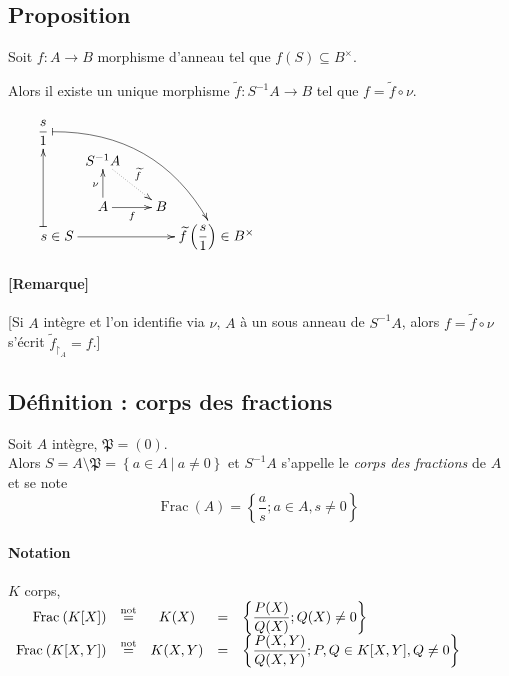 \documentclass[reqno,a4paper,10pt]{report}
\newcommand{\mt}[1]{\widetilde{#1}} %
\newcommand{\set}[1]{\left\lbrace #1 \right\rbrace} %
\newcommand{\Frac}{\mathrm{Frac}\:} %
\newcommand{\rstrct}[2]{{#1}_{\upharpoonright_{#2}}} %
\newcommand{\such}{\ | \ }
\newcommand{\tnot}[1]{\overset{\text{not}}{ #1 }}
\begin{document}
\subsection{Proposition}
Soit $f: A \to B$ morphisme d'anneau tel que $f(S)\subseteq B^\times$.

Alors il existe un unique morphisme $\mt f : S^{-1}A \to B$ tel que $f=\mt f
\circ \nu$.

\begin{comment}
  Preuve 18/11/09 p2 verso
\end{comment}

$\xymatrix@=0.2pc{
\dfrac{s}{1} \ar@/^2pc/@{|->}[dddddrrrrr]\\
& S^{-1}A \ar@{.>}[dddrrr]^{\mt f} \\
\\ \\
& A \ar[uuu]^{\nu} \ar[rrr]_f &&& B\\
\qquad s \in S \ar@{|->}[uuuuu] \ar[rrrrr] & &&& & \mt f\left( \dfrac{s}{1}
\right)\in B^\times }$

\paragraph{[Remarque]}
   [Si $A$ intègre et l'on identifie via $\nu$, $A$ à un sous anneau de
$S^{-1}A$, alors $f=\mt f \circ \nu$ s'écrit $\rstrct{\mt f}{A} = f$.]

\begin{comment}
  Exemples\dots 18/11/09 p3
\end{comment}

\subsection{Définition : corps des fractions}
Soit $A$ intègre, $\mathfrak P = (0)$.\\
Alors $S=A\setminus \mathfrak P = \set{a\in A \such a\neq 0}$ et $S^{-1}A$
s'appelle le \emph{corps des fractions} de $A$ et se note
\[\Frac(A)=\set{\dfrac{a}{s}; a \in A, s \neq 0}\]

\paragraph{Notation} $K$ corps,
$\begin{array}[t]{rcccl}
  \Frac(K[X]) &\tnot =& K(X) &=& \set{\dfrac{P(X)}{Q(X)}; Q(X) \neq 0}\\
  \Frac(K[X,Y]) &\tnot =& K(X,Y) &=& \set{\dfrac{P(X,Y)}{Q(X,Y)};P,Q \in
  K[X,Y], Q \neq 0}
\end{array}
$
\end{document}
